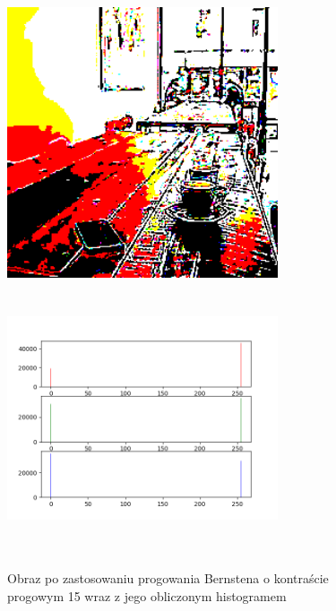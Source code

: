\documentclass[a4paper,12pt]{book}
\begin{document}
\begin{figure}[H]	
	\caption{Obraz po zastosowaniu progowania Bernstena o kontraście progowym 15 wraz z jego obliczonym histogramem}
	\includegraphics[width=8cm, height=8cm]{6-4/single-local-threshold-image-coffee-15.png}
	\includegraphics[width=8cm, height=8cm]{6-4/single-local-threshold-coffee.png}
\end{figure}
\end{document}
